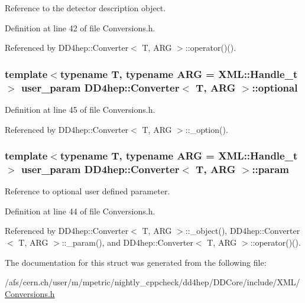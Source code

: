 Reference to the detector description object. 

Definition at line 42 of file Conversions.h.

Referenced by DD4hep::Converter$<$ T, ARG $>$::operator()().\hypertarget{struct_d_d4hep_1_1_converter_a884a538646c4dd3043e3d6234db2cc0d}{
\subsubsection[{optional}]{\setlength{\rightskip}{0pt plus 5cm}template$<$typename T, typename ARG = XML::Handle\_\-t$>$ {\bf user\_\-param} {\bf DD4hep::Converter}$<$ {\bf T}, ARG $>$::{\bf optional}}}
\label{struct_d_d4hep_1_1_converter_a884a538646c4dd3043e3d6234db2cc0d}


Definition at line 45 of file Conversions.h.

Referenced by DD4hep::Converter$<$ T, ARG $>$::\_\-option().\hypertarget{struct_d_d4hep_1_1_converter_ac6d7d17feb235d19267a40c8e6dfb2ca}{
\subsubsection[{param}]{\setlength{\rightskip}{0pt plus 5cm}template$<$typename T, typename ARG = XML::Handle\_\-t$>$ {\bf user\_\-param} {\bf DD4hep::Converter}$<$ {\bf T}, ARG $>$::{\bf param}}}
\label{struct_d_d4hep_1_1_converter_ac6d7d17feb235d19267a40c8e6dfb2ca}


Reference to optional user defined parameter. 

Definition at line 44 of file Conversions.h.

Referenced by DD4hep::Converter$<$ T, ARG $>$::\_\-object(), DD4hep::Converter$<$ T, ARG $>$::\_\-param(), and DD4hep::Converter$<$ T, ARG $>$::operator()().

The documentation for this struct was generated from the following file:\begin{DoxyCompactItemize}
\item 
/afs/cern.ch/user/m/mpetric/nightly\_\-cppcheck/dd4hep/DDCore/include/XML/\hyperlink{_conversions_8h}{Conversions.h}\end{DoxyCompactItemize}
